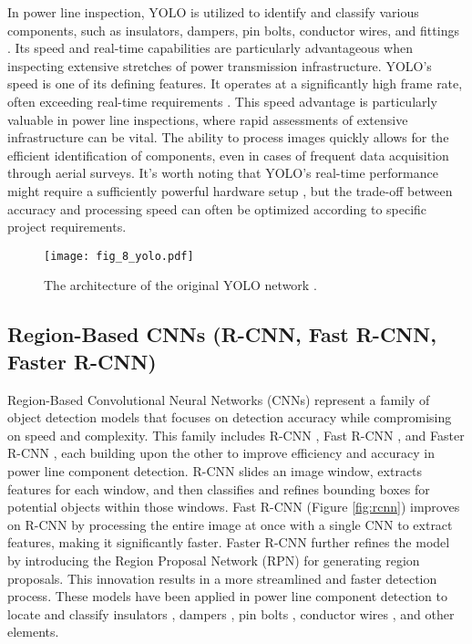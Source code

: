 In power line inspection, YOLO is utilized to identify and classify various components, such as insulators, dampers, pin bolts, conductor wires, and fittings \cite{sadykova2019yolo, singh_2023_interpretable, zhang_cloud_edge_2020}. Its speed and real-time capabilities are particularly advantageous when inspecting extensive stretches of power transmission infrastructure. YOLO's speed is one of its defining features. It operates at a significantly high frame rate, often exceeding real-time requirements \cite{li_improved_2022}. This speed advantage is particularly valuable in power line inspections, where rapid assessments of extensive infrastructure can be vital. The ability to process images quickly allows for the efficient identification of components, even in cases of frequent data acquisition through aerial surveys. It's worth noting that YOLO's real-time performance might require a sufficiently powerful hardware setup \cite{ultralyticsFrequentlyAsked}, but the trade-off between accuracy and processing speed can often be optimized according to specific project requirements.

\begin{figure*}[htb]
    \centering
    \texttt{[image: fig\_8\_yolo.pdf]}
    \caption{The architecture of the original YOLO network \cite{redmon_you_2016}.}
    \label{fig:yolo}
\end{figure*}

\subsection{Region-Based CNNs (R-CNN, Fast R-CNN, Faster R-CNN)}
Region-Based Convolutional Neural Networks (CNNs) \cite{girshick_rich_2014} represent a family of object detection models that focuses on detection accuracy while compromising on speed and complexity. This family includes R-CNN \cite{girshick_rich_2014}, Fast R-CNN \cite{girshick_fast_2015}, and Faster R-CNN \cite{ren_faster_2016}, each building upon the other to improve efficiency and accuracy in power line component detection. R-CNN slides an image window, extracts features for each window, and then classifies and refines bounding boxes for potential objects within those windows. Fast R-CNN (Figure \ref{fig:rcnn}) improves on R-CNN by processing the entire image at once with a single CNN to extract features, making it significantly faster. Faster R-CNN further refines the model by introducing the Region Proposal Network (RPN) \cite{ren_faster_2016} for generating region proposals. This innovation results in a more streamlined and faster detection process. These models have been applied in power line component detection to locate and classify insulators \cite{wei_online_2022}, dampers \cite{zhai_hybrid_2021}, pin bolts \cite{zhai_hybrid_2021}, conductor wires \cite{rong_intelligent_2021}, and other elements.

